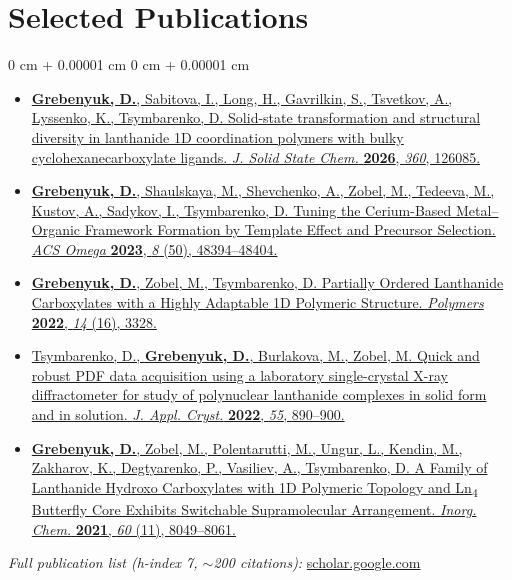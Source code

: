 \documentclass[10pt, letterpaper]{article}
\newenvironment{onecolentry}{
    \begin{adjustwidth}{
        0 cm + 0.00001 cm
    }{
        0 cm + 0.00001 cm
    }
}{
    \end{adjustwidth}
} %
\begin{document}
    \section{Selected Publications}
    \vspace{0.04 cm}
    \begin{onecolentry}
        \begin{itemize}[
            topsep=0.03 cm,
            parsep=0.05 cm,
            partopsep=0pt,
            itemsep=0pt,
            leftmargin=0 cm + 10pt
        ]
            \item \href{https://www.sciencedirect.com/science/article/pii/S0022459626002811}{\textbf{Grebenyuk, D.}, Sabitova, I., Long, H., Gavrilkin, S., Tsvetkov, A., Lyssenko, K., Tsymbarenko, D.
            Solid-state transformation and structural diversity in lanthanide 1D coordination polymers with bulky cyclohexanecarboxylate ligands.
            \textit{J. Solid State Chem.} \textbf{2026}, \textit{360}, 126085.}

            \item \href{https://pubs.acs.org/doi/10.1021/acsomega.3c07906}{\textbf{Grebenyuk, D.}, Shaulskaya, M., Shevchenko, A., Zobel, M., Tedeeva, M., Kustov, A., Sadykov, I., Tsymbarenko, D.
            Tuning the Cerium-Based Metal–Organic Framework Formation by Template Effect and Precursor Selection.
            \textit{ACS Omega} \textbf{2023}, \textit{8} (50), 48394–48404.}

            \item \href{https://www.mdpi.com/2073-4360/14/16/3328}{\textbf{Grebenyuk, D.}, Zobel, M., Tsymbarenko, D.
            Partially Ordered Lanthanide Carboxylates with a Highly Adaptable 1D Polymeric Structure.
            \textit{Polymers} \textbf{2022}, \textit{14} (16), 3328.}

            \item \href{https://doi.org/10.1107/S1600576722005878}{Tsymbarenko, D., \textbf{Grebenyuk, D.}, Burlakova, M., Zobel, M.
            Quick and robust PDF data acquisition using a laboratory single-crystal X-ray diffractometer for study of polynuclear lanthanide complexes in solid form and in solution.
            \textit{J. Appl. Cryst.} \textbf{2022}, \textit{55}, 890–900.}

            \item \href{https://pubs.acs.org/doi/10.1021/acs.inorgchem.1c00581}{\textbf{Grebenyuk, D.}, Zobel, M., Polentarutti, M., Ungur, L., Kendin, M., Zakharov, K., Degtyarenko, P., Vasiliev, A., Tsymbarenko, D.
            A Family of Lanthanide Hydroxo Carboxylates with 1D Polymeric Topology and Ln\textsubscript{4} Butterfly Core Exhibits Switchable Supramolecular Arrangement.
            \textit{Inorg. Chem.} \textbf{2021}, \textit{60} (11), 8049–8061.}
        \end{itemize}
        \vspace{0.06cm}
        \textit{Full publication list (h-index 7, $\sim$200 citations):} \href{https://scholar.google.com/citations?user=pNWZLJoAAAAJ&hl=en}{scholar.google.com}
    \end{onecolentry}
\end{document}
